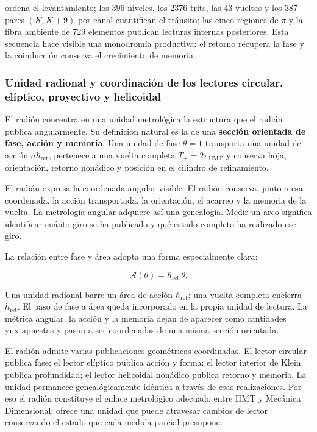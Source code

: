ordena el levantamiento; los \(396\) niveles, los \(2376\) trits, las \(43\) vueltas y los \(387\) pares \((K,K+9)\) por canal cuantifican el tránsito; las cinco regiones de \(\pi\) y la fibra ambiente de \(729\) elementos publican lecturas internas posteriores. Esta secuencia hace visible una monodromía productiva: el retorno recupera la fase y la coinducción conserva el crecimiento de memoria.

\subsubsection{Unidad radional y coordinación de los lectores circular, elíptico, proyectivo y helicoidal}

El radión concentra en una unidad metrológica la estructura que el radián publica angularmente. Su definición natural es la de una \textbf{sección orientada de fase, acción y memoria}. Una unidad de fase \(\theta=1\) transporta una unidad de acción \(\sigma\hbar_{\mathrm{ret}}\), pertenece a una vuelta completa \(T_+=2\pi_{\mathrm{HMT}}\) y conserva hoja, orientación, retorno nonádico y posición en el cilindro de refinamiento.

El radián expresa la coordenada angular visible. El radión conserva, junto a esa coordenada, la acción transportada, la orientación, el acarreo y la memoria de la vuelta. La metrología angular adquiere así una genealogía. Medir un arco significa identificar cuánto giro se ha publicado y qué estado completo ha realizado ese giro.

La relación entre fase y área adopta una forma especialmente clara:

\[
\mathcal A(\theta)=\hbar_{\mathrm{ret}}\,\theta.
\]

Una unidad radional barre un área de acción \(\hbar_{\mathrm{ret}}\); una vuelta completa encierra \(h_{\mathrm{ret}}\). El paso de fase a área queda incorporado en la propia unidad de lectura. La métrica angular, la acción y la memoria dejan de aparecer como cantidades yuxtapuestas y pasan a ser coordenadas de una misma sección orientada.

El radión admite varias publicaciones geométricas coordinadas. El lector circular publica fase; el lector elíptico publica acción y forma; el lector interior de Klein publica profundidad; el lector helicoidal nonádico publica retorno y memoria. La unidad permanece genealógicamente idéntica a través de esas realizaciones. Por eso el radión constituye el enlace metrológico adecuado entre HMT y Mecánica Dimensional: ofrece una unidad que puede atravesar cambios de lector conservando el estado que cada medida parcial presupone.

